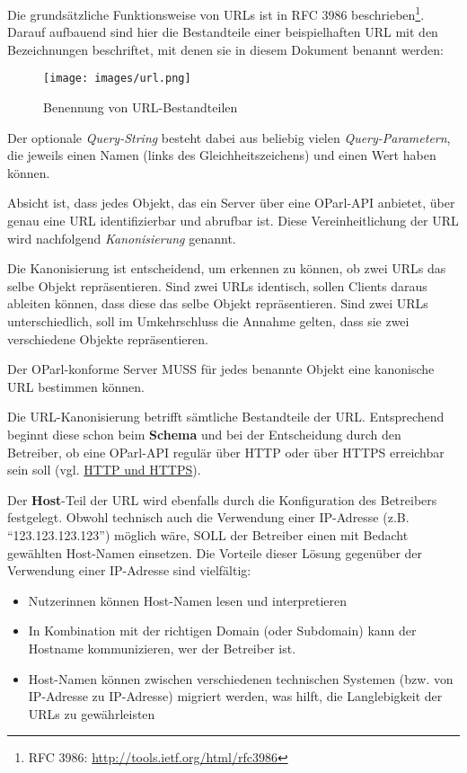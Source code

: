 \documentclass[,a4paper]{article}
\makeatletter
\def\maxwidth{\ifdim\Gin@nat@width>\linewidth\linewidth
\else\Gin@nat@width\fi}
\let\Oldincludegraphics\includegraphics
\renewcommand{\includegraphics}[1]{\Oldincludegraphics[width=\maxwidth]{#1}}
\makeatother
\begin{document}
Die grundsätzliche Funktionsweise von URLs ist in RFC 3986
beschrieben\footnote{RFC 3986: \url{http://tools.ietf.org/html/rfc3986}}.
Darauf aufbauend sind hier die Bestandteile einer beispielhaften URL mit
den Bezeichnungen beschriftet, mit denen sie in diesem Dokument benannt
werden:

\begin{figure}[htbp]
\centering
\texttt{[image: images/url.png]}
\caption{Benennung von URL-Bestandteilen}
\end{figure}

Der optionale \emph{Query-String} besteht dabei aus beliebig vielen
\emph{Query-Parametern}, die jeweils einen Namen (links des
Gleichheitszeichens) und einen Wert haben können.


Absicht ist, dass jedes Objekt, das ein Server über eine OParl-API
anbietet, über genau eine URL identifizierbar und abrufbar ist. Diese
Vereinheitlichung der URL wird nachfolgend \emph{Kanonisierung} genannt.

Die Kanonisierung ist entscheidend, um erkennen zu können, ob zwei URLs
das selbe Objekt repräsentieren. Sind zwei URLs identisch, sollen
Clients daraus ableiten können, dass diese das selbe Objekt
repräsentieren. Sind zwei URLs unterschiedlich, soll im Umkehrschluss
die Annahme gelten, dass sie zwei verschiedene Objekte repräsentieren.

Der OParl-konforme Server MUSS für jedes benannte Objekt eine kanonische
URL bestimmen können.

Die URL-Kanonisierung betrifft sämtliche Bestandteile der URL.
Entsprechend beginnt diese schon beim \textbf{Schema} und bei der
Entscheidung durch den Betreiber, ob eine OParl-API regulär über HTTP
oder über HTTPS erreichbar sein soll (vgl.
\hyperref[http-und-https]{HTTP und HTTPS}).

Der \textbf{Host}-Teil der URL wird ebenfalls durch die Konfiguration
des Betreibers festgelegt. Obwohl technisch auch die Verwendung einer
IP-Adresse (z.B. ``123.123.123.123'') möglich wäre, SOLL der Betreiber
einen mit Bedacht gewählten Host-Namen einsetzen. Die Vorteile dieser
Lösung gegenüber der Verwendung einer IP-Adresse sind vielfältig:

\begin{itemize}
\itemsep1pt\parskip0pt
\item
  Nutzerinnen können Host-Namen lesen und interpretieren
\item
  In Kombination mit der richtigen Domain (oder Subdomain) kann der
  Hostname kommunizieren, wer der Betreiber ist.
\item
  Host-Namen können zwischen verschiedenen technischen Systemen (bzw.
  von IP-Adresse zu IP-Adresse) migriert werden, was hilft, die
  Langlebigkeit der URLs zu gewährleisten
\end{itemize}
\end{document}
